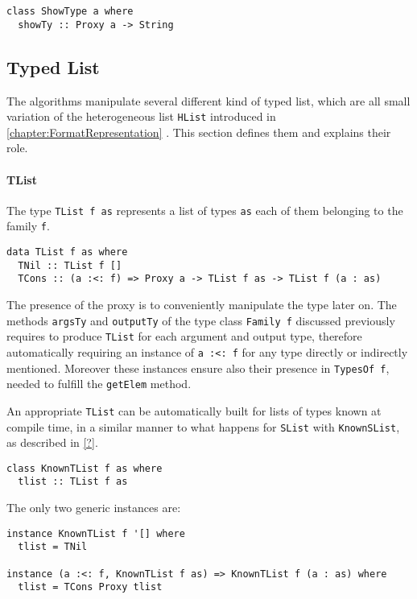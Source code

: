 \documentclass[../Thesis.tex]{subfiles}
\begin{document}
\begin{verbatim}
class ShowType a where
  showTy :: Proxy a -> String
\end{verbatim}
	
	\subsection{Typed List}		
	The algorithms manipulate several different kind of typed list,
	which are all small variation of the heterogeneous list \texttt{HList} 
	introduced in \ref{chapter:FormatRepresentation} . This section defines them and explains their role.
	
	\paragraph{TList}
	The type \texttt{TList f as} represents a list of types \texttt{as} each 
	of them belonging to the family \texttt{f}.

\begin{verbatim}
data TList f as where
  TNil :: TList f []
  TCons :: (a :<: f) => Proxy a -> TList f as -> TList f (a : as)
\end{verbatim}

	The presence of the proxy is to conveniently manipulate the type later on.
	The methods \texttt{argsTy} and \texttt{outputTy} of the type class
	\texttt{Family f} discussed previously requires to produce \texttt{TList}
	for each argument and output type, therefore automatically requiring
	an instance of \texttt{a :<: f} for any type directly or indirectly mentioned. 
	Moreover	these instances ensure also their presence in \texttt{TypesOf f},
	needed to fulfill the \texttt{getElem} method.
	
	An appropriate \texttt{TList} can be automatically built for lists of types 
	known at compile time, in a similar manner to what happens for
	\texttt{SList} with \texttt{KnownSList}, as described in \ref{?}.
	
\begin{verbatim}
class KnownTList f as where
  tlist :: TList f as
\end{verbatim}
	The only two generic instances are:
\begin{verbatim}
instance KnownTList f '[] where
  tlist = TNil

instance (a :<: f, KnownTList f as) => KnownTList f (a : as) where
  tlist = TCons Proxy tlist
\end{verbatim}
\end{document}
